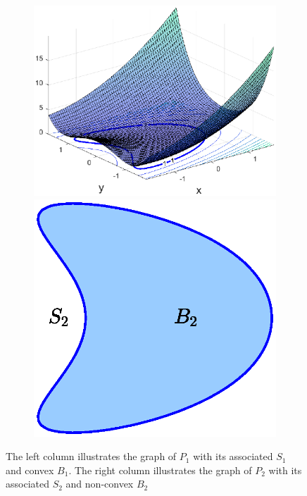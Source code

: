 \documentclass[smallextended]{svjour3}
\theoremstyle{remark}
\begin{document}
\begin{example}
\begin{figure}[!htb]
\begin{subfigure}{0.5\textwidth}
    \end{subfigure}%
    \hspace{-20pt}
    \begin{subfigure}{0.5\textwidth}
    \centering
    \includegraphics[scale=0.4]{Fig1c.eps}
    \vspace{-10pt}
    \includegraphics[scale=0.4]{Fig1d.eps}
    \end{subfigure}
    \caption{The left column illustrates the graph of $P_1$ with its associated $S_1$ and convex $B_1$. The right column illustrates the graph of $P_2$ with its associated $S_2$ and non-convex $B_2$}

\end{figure}
\end{example}
\end{document}
